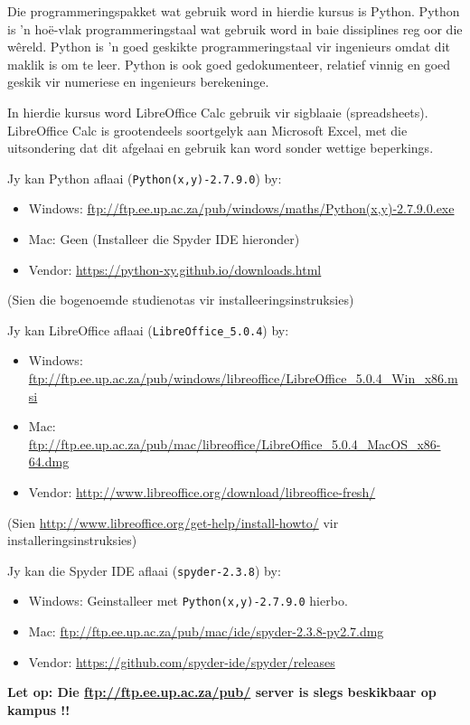         Die programmeringspakket wat gebruik word in hierdie kursus is Python.
        Python is 'n ho\"{e}-vlak programmeringstaal wat gebruik word in baie
        dissiplines reg oor die w\^{e}reld. Python is 'n goed geskikte
        programmeringstaal vir ingenieurs omdat dit maklik is om te leer.
        Python is ook goed gedokumenteer, relatief vinnig en goed geskik vir
        numeriese en ingenieurs berekeninge.

        In hierdie kursus word LibreOffice Calc gebruik vir sigblaaie
        (spreadsheets). LibreOffice Calc is grootendeels soortgelyk aan
        Microsoft Excel, met die uitsondering dat dit afgelaai en gebruik kan
        word sonder wettige beperkings.

        \noindent
        Jy kan Python aflaai ({\tt Python(x,y)-2.7.9.0}) by:
        \begin{itemize}
            \item Windows: \url{ftp://ftp.ee.up.ac.za/pub/windows/maths/Python(x,y)-2.7.9.0.exe}
            \item Mac: Geen (Installeer die Spyder IDE hieronder)
            \item Vendor: \url{https://python-xy.github.io/downloads.html}
        \end{itemize}
        (Sien die bogenoemde studienotas vir installeeringsinstruksies)

        \noindent
        Jy kan LibreOffice aflaai ({\tt LibreOffice\_5.0.4}) by:
        \begin{itemize}
            \item Windows: \url{ftp://ftp.ee.up.ac.za/pub/windows/libreoffice/LibreOffice_5.0.4_Win_x86.msi}
            \item Mac: \url{ftp://ftp.ee.up.ac.za/pub/mac/libreoffice/LibreOffice_5.0.4_MacOS_x86-64.dmg}
            \item Vendor: \url{http://www.libreoffice.org/download/libreoffice-fresh/}
        \end{itemize}
        (Sien \url{http://www.libreoffice.org/get-help/install-howto/} vir
        installeringsinstruksies)

        \noindent
        Jy kan die Spyder IDE aflaai ({\tt spyder-2.3.8}) by:
        \begin{itemize}
            \item Windows: Geinstalleer met {\tt Python(x,y)-2.7.9.0} hierbo.
            \item Mac: \url{ftp://ftp.ee.up.ac.za/pub/mac/ide/spyder-2.3.8-py2.7.dmg}
            \item Vendor: \url{https://github.com/spyder-ide/spyder/releases}
        \end{itemize}

        \noindent
        \textbf{Let op: Die \url{ftp://ftp.ee.up.ac.za/pub/} server is slegs
        beskikbaar op kampus !!}
